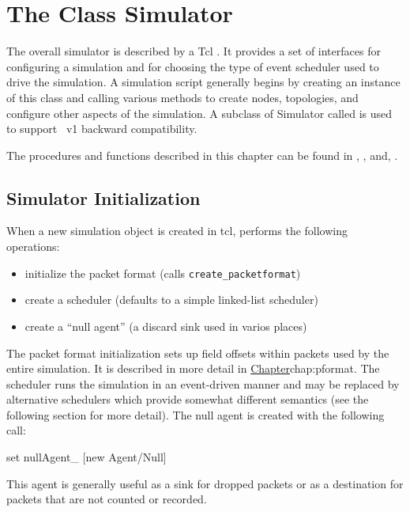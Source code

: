 %
%
\chapter{The Class Simulator}
\label{chap:sim}

The overall simulator is described by a Tcl
.
It provides a set of interfaces for configuring a simulation
and for choosing the type of event scheduler used to drive
the simulation.
A simulation script generally begins by creating an instance
of this class and calling various methods to create nodes, topologies,
and configure other aspects of the simulation.
A subclass of Simulator called  is used to support
\ns~v1 backward compatibility.

The procedures and functions described in this chapter can be found in
, , and, .

\section{Simulator Initialization}
\label{sec:siminit}

When a new simulation object is created in tcl,
performs the following operations:
\begin{itemize}
        \item initialize the packet format (calls {\tt create\_packetformat})
        \item create a scheduler (defaults to a simple linked-list scheduler)
        \item create a ``null agent'' (a discard sink used in varios places)
\end{itemize}
The packet format initialization sets up field offsets within packets
used by the entire simulation.  It is described in more detail
in \href{the following chapter on packets}{Chapter}{chap:pformat}.
The scheduler runs the simulation in an event-driven manner and may
be replaced by alternative schedulers which provide somewhat
different semantics (see the following section for more detail).
The null agent is created with the following call:
\begin{program}
        set nullAgent_ [new Agent/Null]
\end{program}
This agent is generally useful as a sink for dropped packets or
as a destination for packets that are not counted or recorded.


